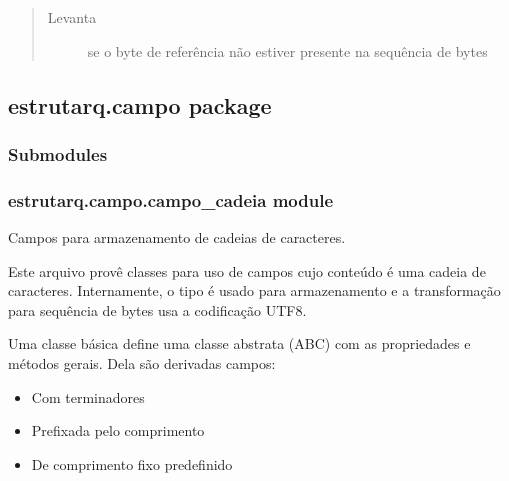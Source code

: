 \documentclass[letterpaper,10pt,brazil]{sphinxmanual}
\begin{document}
\begin{fulllineitems}
\begin{fulllineitems}
\begin{quote}
\begin{description}
\item[{Levanta}] \leavevmode
\sphinxAtStartPar
{} \textendash{} se o byte de referência não estiver presente na
sequência de bytes

\end{description}\end{quote}

\end{fulllineitems}


\end{fulllineitems}


\sphinxstepscope


\subsection{estrutarq.campo package}
\label{\detokenize{estrutarq.campo:estrutarq-campo-package}}\label{\detokenize{estrutarq.campo::doc}}

\subsubsection{Submodules}
\label{\detokenize{estrutarq.campo:submodules}}

\subsubsection{estrutarq.campo.campo\_cadeia module}
\label{\detokenize{estrutarq.campo:module-estrutarq.campo.campo_cadeia}}\label{\detokenize{estrutarq.campo:estrutarq-campo-campo-cadeia-module}}
\sphinxAtStartPar
Campos para armazenamento de cadeias de caracteres.

\sphinxAtStartPar
Este arquivo provê classes para uso de campos cujo conteúdo é
uma cadeia de caracteres. Internamente, o tipo  é usado
para armazenamento e a transformação para sequência de bytes
usa a codificação UTF\sphinxhyphen{}8.

\sphinxAtStartPar
Uma classe básica {\hyperref[\detokenize{estrutarq.campo:estrutarq.campo.campo_cadeia.CampoCadeiaBasico}]{}} define uma classe
abstrata (ABC) com as propriedades e métodos gerais. Dela são
derivadas campos:
\begin{itemize}
\item {} 
\sphinxAtStartPar
Com terminadores

\item {} 
\sphinxAtStartPar
Prefixada pelo comprimento

\item {} 
\sphinxAtStartPar
De comprimento fixo predefinido

\end{itemize}
\end{document}
